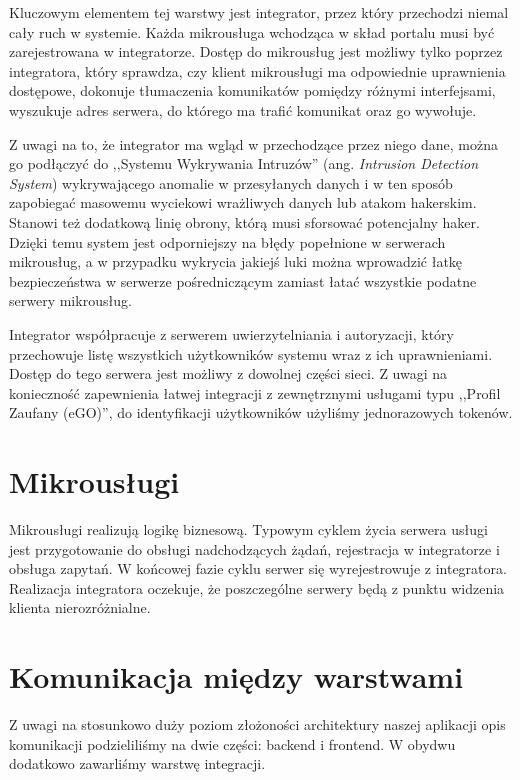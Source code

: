 \documentclass[licencjacka]{pracamgr}
\begin{document}
Kluczowym elementem tej warstwy jest integrator, przez który przechodzi niemal
cały ruch w systemie. Każda mikrousługa wchodząca w skład portalu musi być
zarejestrowana w integratorze. Dostęp do mikrousług jest możliwy tylko poprzez
integratora, który sprawdza, czy klient mikrousługi ma odpowiednie uprawnienia
dostępowe, dokonuje tłumaczenia komunikatów pomiędzy różnymi interfejsami,
wyszukuje adres serwera, do którego ma trafić komunikat oraz go wywołuje.

Z uwagi na to, że integrator ma wgląd w przechodzące przez niego dane, można
go podłączyć do ,,Systemu Wykrywania Intruzów'' (ang. \textit{Intrusion Detection System}) wykrywającego
anomalie w przesyłanych danych i w ten sposób zapobiegać masowemu wyciekowi
wrażliwych danych lub atakom hakerskim. Stanowi też dodatkową linię obrony, którą
musi sforsować potencjalny haker. Dzięki temu system jest odporniejszy na błędy
popełnione w serwerach mikrousług, a w przypadku wykrycia jakiejś luki można
wprowadzić łatkę bezpieczeństwa w serwerze pośredniczącym zamiast łatać
wszystkie podatne serwery mikrousług.

Integrator współpracuje z serwerem uwierzytelniania i autoryzacji, który przechowuje
listę wszystkich użytkowników systemu wraz z ich uprawnieniami. Dostęp do tego
serwera jest możliwy z dowolnej części sieci. Z uwagi na konieczność zapewnienia
łatwej integracji z zewnętrznymi usługami typu ,,Profil Zaufany (eGO)'', do
identyfikacji użytkowników użyliśmy jednorazowych tokenów.

\section{Mikrousługi}

Mikrousługi realizują logikę biznesową. Typowym cyklem życia serwera usługi jest
przygotowanie do obsługi nadchodzących żądań, rejestracja w integratorze i obsługa
zapytań. W końcowej fazie cyklu serwer się wyrejestrowuje z integratora. Realizacja
integratora oczekuje, że poszczególne serwery będą z punktu widzenia klienta
nierozróżnialne.

\section{Komunikacja między warstwami}

Z uwagi na stosunkowo duży poziom złożoności architektury naszej aplikacji opis
komunikacji podzieliliśmy na dwie części: backend i frontend. W obydwu dodatkowo
zawarliśmy warstwę integracji.
\end{document}
